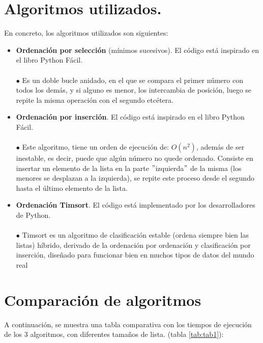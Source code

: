\documentclass[a4,12pt]{article}
\begin{document}
	\section{Algoritmos utilizados.}
	En concreto, los algoritmos utilizados son siguientes:
	\begin{itemize}
		\item \textbf{Ordenación por selección} (mínimos sucesivos).
			\subitem El código está inspirado en el libro \cite{bibid}Python Fácil. \\\\ $\bullet$ Es un doble bucle anidado, en el que se compara el primer número con todos los demás, y si alguno es menor, los intercambia de posición, luego se repite la misma operación con el segundo etcétera.
		\item \textbf{Ordenación por inserción}.
			\subitem El código está inspirado en el libro \cite{bibid}Python Fácil. \\\\ $\bullet$ Este algoritmo, tiene un orden de ejecución de: $O(n^{2})$, además de ser inestable, es decir, puede que algún número no quede ordenado. Consiste en insertar un elemento de la lista en la parte $"$izquierda$"$ de la misma (los menores se desplazan a la izquierda), se repite este proceso desde el segundo hasta el último elemento de la lista.
		\item \textbf{Ordenación Timsort}.
			\subitem El código está implementado por los desarrolladores de Python.\\\\ $\bullet$ Timsort es un algoritmo de clasificación estable (ordena siempre bien las listas) híbrido, derivado de la ordenación por ordenación y clasificación por inserción, diseñado para funcionar bien en muchos tipos de datos del mundo real
	\end{itemize}
	
	
	\section{Comparación de algoritmos}
	
	
	A continuación, se muestra una tabla comparativa con los tiempos de ejecución de los 3 algoritmos, con diferentes tamaños de lista. (tabla \ref{tab:tab1}):
	
\end{document}

